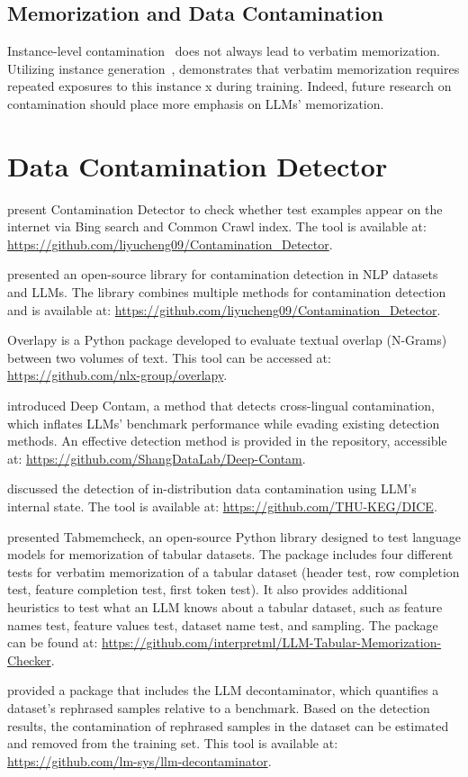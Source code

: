 \subsection{Memorization and Data Contamination}

Instance-level contamination~\cite{fu2024does} does not always lead to verbatim memorization. Utilizing instance generation~\cite{carlini2022quantifying,karamolegkou-etal-2023-copyright}, demonstrates that verbatim memorization requires repeated exposures to this instance x during training. Indeed, future research on contamination should place more emphasis on LLMs' memorization.

\section{Data Contamination Detector}
\label{sec:Data contamination Detector}
\citet{Li2023AnOS} present Contamination Detector to check whether test examples appear on the internet via Bing search and Common Crawl index. The tool is available at: \url{https://github.com/liyucheng09/Contamination_Detector}.

\citet{ravaut2024much} presented an open-source library for contamination detection in NLP datasets and LLMs. The library combines multiple methods for contamination detection and is available at: \url{https://github.com/liyucheng09/Contamination_Detector}.

Overlapy is a Python package developed to evaluate textual overlap (N-Grams) between two volumes of text. This tool can be accessed at: \url{https://github.com/nlx-group/overlapy}.

\citet{yao-etal-2024-data} introduced Deep Contam, a method that detects cross-lingual contamination, which inflates LLMs' benchmark performance while evading existing detection methods. An effective detection method is provided in the repository, accessible at: \url{https://github.com/ShangDataLab/Deep-Contam}.

\citet{tu2024dicedetectingindistributioncontamination} discussed the detection of in-distribution data contamination using LLM's internal state. The tool is available at: \url{https://github.com/THU-KEG/DICE}.

\citet{bordt2023testing, bordt2024colm} presented Tabmemcheck, an open-source Python library designed to test language models for memorization of tabular datasets. The package includes four different tests for verbatim memorization of a tabular dataset (header test, row completion test, feature completion test, first token test). It also provides additional heuristics to test what an LLM knows about a tabular dataset, such as feature names test, feature values test, dataset name test, and sampling. The package can be found at: \url{https://github.com/interpretml/LLM-Tabular-Memorization-Checker}.

\citet{yang2023rethinkingbenchmarkcontaminationlanguage} provided a package that includes the LLM decontaminator, which quantifies a dataset's rephrased samples relative to a benchmark. Based on the detection results, the contamination of rephrased samples in the dataset can be estimated and removed from the training set. This tool is available at: \url{https://github.com/lm-sys/llm-decontaminator}.
